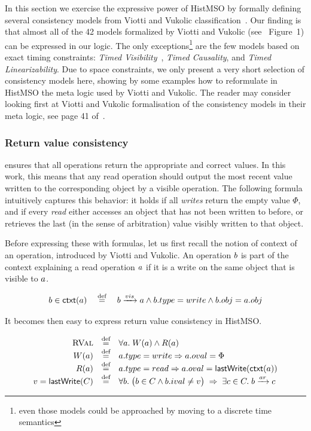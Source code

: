 In this section we exercise the expressive power of HistMSO by formally defining several consistency models from Viotti and Vukolic classification~\cite{ViottiVukolic}. Our finding is that almost all of the 42 models formalized by Viotti and Vukolic (see~\cite{ViottiVukolic} Figure~1) can be expressed in our logic. The only exceptions\footnote{even those models could be approached by moving to a discrete time semantics} are the few models based on exact timing constraints: \textsl{Timed Visibility}~\cite{DBLP:conf/spaa/SinglaRH97}, \textsl{Timed Causality}, and \textsl{Timed Linearizability}. Due to space constraints, we only present a very short selection of consistency models here, showing by some examples how to reformulate in HistMSO the meta logic used by Viotti and Vukolic. The reader may consider looking first at Viotti and Vukolic
formalisation of the consistency models in their meta logic, see page 41 of~\cite{ViottiVukolic}.

\subsubsection{Return value consistency} ensures that all operations return the appropriate and correct values. In this work, this means that any read operation should output the most recent value written to the corresponding object by a visible operation. The following formula intuitively captures this behavior: it holds if all \textsl{writes} return the empty value $\Phi$, and if every \textsl{read} either accesses an object that has not been written to before, or retrieves the last (in the sense of arbitration) value visibly written to that object.

Before expressing these with formulas, let us first recall the notion of context of an operation, introduced by Viotti and Vukolic. An operation $b$ is part of the context explaining a read operation $a$ if it is a write on the same object that is visible to $a$.

$$
b\in\mathsf{ctxt}(a) \quad \stackrel{\text{def}}{=}\quad b\xrightarrow{vis} a\wedge b.type=write\wedge b.obj=a.obj
$$

It becomes then easy to express return value consistency in HistMSO.

$$
    \begin{array}{rcl}
        \textsc{RVal} & \stackrel{\text{def}}{=} & \forall a.\; W(a) \wedge R(a)
        \\
        W(a) & \stackrel{\text{def}}{=} & a.type = write \Rightarrow a.oval = \Phi 
        \\ 
        R(a) & \stackrel{\text{def}}{=} & a.type = read \Rightarrow a.oval=\mathsf{lastWrite}(\mathsf{ctxt}(a)) 
        \\
        v=\mathsf{lastWrite}(C) & \stackrel{\text{def}}{=} & \forall b.\; \big(b\in C\wedge b.ival\neq v\big)\; \Rightarrow\; \exists c \in C.\; b\xrightarrow{ar}c
    \end{array}
$$

